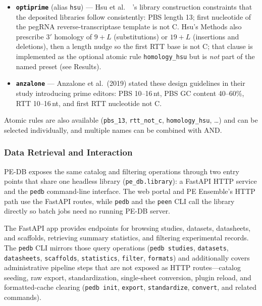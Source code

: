 \documentclass{article}
\begin{document}
\begin{itemize}
    \item \textbf{\nolinkurl{optiprime}} (alias \nolinkurl{hsu}) --- Hsu et al.\ ~'s library construction constraints that the deposited libraries follow consistently: PBS length 13; first nucleotide of the pegRNA reverse-transcriptase template is not C. Hsu's Methods also prescribe 3$'$ homology of $9+L$ (substitutions) or $19+L$ (insertions and deletions), then a length nudge so the first RTT base is not C; that clause is implemented as the optional atomic rule \nolinkurl{homology\_hsu} but is \emph{not} part of the named preset (see Results).
    \item \textbf{\nolinkurl{anzalone}} --- Anzalone et al.\ (2019) stated these design guidelines in their study introducing prime editors: PBS 10--16\,nt, PBS GC content 40--60\%, RTT 10--16\,nt, and first RTT nucleotide not C.
\end{itemize}

Atomic rules are also available (\nolinkurl{pbs\_13}, \nolinkurl{rtt\_not\_c}, \nolinkurl{homology\_hsu}, \ldots) and can be selected individually, and multiple names can be combined with AND. 

\subsubsection{Data Retrieval and Interaction}

PE-DB exposes the same catalog and filtering operations through two entry points that share one headless library (\nolinkurl{pe\_db.library}): a FastAPI HTTP service and the \nolinkurl{pedb} command-line interface. The web portal and PE Ensemble's HTTP path use the FastAPI routes, while \nolinkurl{pedb} and the \nolinkurl{peen} CLI call the library directly so batch jobs need no running PE-DB server.

The FastAPI app provides endpoints for browsing studies, datasets, datasheets, and scaffolds, retrieving summary statistics, and filtering experimental records. The \nolinkurl{pedb} CLI mirrors those query operations (\nolinkurl{pedb studies}, \nolinkurl{datasets}, \nolinkurl{datasheets}, \nolinkurl{scaffolds}, \nolinkurl{statistics}, \nolinkurl{filter}, \nolinkurl{formats}) and additionally covers administrative pipeline steps that are not exposed as HTTP routes---catalog seeding, raw export, standardization, single-sheet conversion, plugin reload, and formatted-cache clearing (\nolinkurl{pedb init}, \nolinkurl{export}, \nolinkurl{standardize}, \nolinkurl{convert}, and related commands).
\end{document}
